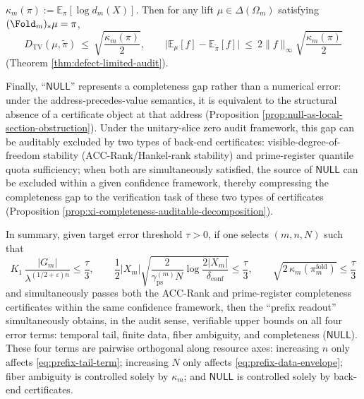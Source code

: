 \begin{theorem}
\(
\kappa_m(\pi):=\mathbb{E}_\pi[\log d_m(X)]
\).
Then for any lift \(\mu\in\Delta(\Omega_m)\) satisfying \((\Fold_m)_*\mu=\pi\),
\begin{equation}\label{eq:prefix-fiber-term}
\boxed{\;
D_{\mathrm{TV}}(\mu,\widetilde\pi)\ \le\ \sqrt{\frac{\kappa_m(\pi)}{2}},
\qquad
\bigl|\mathbb{E}_\mu[f]-\mathbb{E}_{\widetilde\pi}[f]\bigr|
\ \le\
2\|f\|_\infty\sqrt{\frac{\kappa_m(\pi)}{2}}\;}
\end{equation}
(Theorem \ref{thm:defect-limited-audit}).
\par
Finally, ``\(\mathsf{NULL}\)'' represents a completeness gap rather than a numerical error: under the address-precedes-value semantics, it is equivalent to the structural absence of a certificate object at that address (Proposition \ref{prop:null-as-local-section-obstruction}).
Under the unitary-slice zero audit framework, this gap can be auditably excluded by two types of back-end certificates: visible-degree-of-freedom stability (ACC-Rank/Hankel-rank stability) and prime-register quantile quota sufficiency; when both are simultaneously satisfied, the source of \(\mathsf{NULL}\) can be excluded within a given confidence framework, thereby compressing the completeness gap to the verification task of these two types of certificates (Proposition \ref{prop:xi-completeness-auditable-decomposition}).
\par
In summary, given target error threshold \(\tau>0\), if one selects \((m,n,N)\) such that
\begin{equation}\label{eq:prefix-audit-budget-sufficient}
\boxed{\;
K_1\,\frac{|G_m|}{\lambda^{(1/2+\varepsilon)n}}\le \frac{\tau}{3},
\qquad
\frac12|X_m|\sqrt{\frac{2}{\gamma_{\mathrm{ps}}^{(m)}N}\log\frac{2|X_m|}{\delta_{\mathrm{conf}}}}\le \frac{\tau}{3},
\qquad
\sqrt{2\,\kappa_m(\pi_m^{\mathrm{fold}})}\le \frac{\tau}{3}\;}
\end{equation}
and simultaneously passes both the ACC-Rank and prime-register completeness certificates within the same confidence framework, then the ``prefix readout'' simultaneously obtains, in the audit sense, verifiable upper bounds on all four error terms: temporal tail, finite data, fiber ambiguity, and completeness (\(\mathsf{NULL}\)).
These four terms are pairwise orthogonal along resource axes: increasing \(n\) only affects \eqref{eq:prefix-tail-term}; increasing \(N\) only affects \eqref{eq:prefix-data-envelope}; fiber ambiguity is controlled solely by \(\kappa_m\); and \(\mathsf{NULL}\) is controlled solely by back-end certificates.
\end{theorem}

